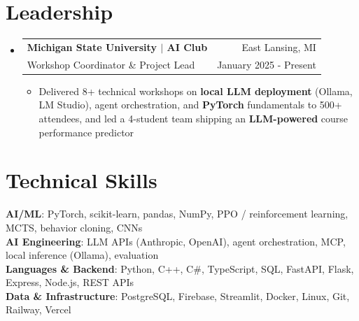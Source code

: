 \documentclass[letterpaper,11pt]{article}
\makeatletter
\newcommand{\resumeItem}[1]{
  \item\small{
    {#1 \vspace{-2pt}}
  }
}
\newcommand{\resumeSubheading}[4]{
  \vspace{-2pt}\item
    \begin{tabular*}{0.97\textwidth}[t]{l@{\extracolsep{\fill}}r}
      \textbf{#1} & \small #2 \\
      \small#3 & \small #4 \\
    \end{tabular*}\vspace{-7pt}
}
\newcommand{\resumeSubHeadingListStart}{\begin{itemize}[leftmargin=0.15in, label={}]}
\newcommand{\resumeSubHeadingListEnd}{\end{itemize}}
\newcommand{\resumeItemListStart}{\begin{itemize}}
\newcommand{\resumeItemListEnd}{\end{itemize}\vspace{-5pt}}
\makeatother
\begin{document}
\section{Leadership}
  \resumeSubHeadingListStart
    \resumeSubheading
      {Michigan State University $|$ AI Club}{East Lansing, MI}
      {Workshop Coordinator \& Project Lead}{January 2025 - Present}
      \resumeItemListStart
        \resumeItem{Delivered 8+ technical workshops on \textbf{local LLM deployment} (Ollama, LM Studio), agent orchestration, and \textbf{PyTorch} fundamentals to 500+ attendees, and led a 4-student team shipping an \textbf{LLM-powered} course performance predictor}
      \resumeItemListEnd
  \resumeSubHeadingListEnd

\section{Technical Skills}
 \begin{itemize}[leftmargin=0.15in, label={}]
    \small{\item{
     \textbf{AI/ML}{: PyTorch, scikit-learn, pandas, NumPy, PPO / reinforcement learning, MCTS, behavior cloning, CNNs} \\
     \textbf{AI Engineering}{: LLM APIs (Anthropic, OpenAI), agent orchestration, MCP, local inference (Ollama), evaluation} \\
     \textbf{Languages \& Backend}{: Python, C++, C\#, TypeScript, SQL, FastAPI, Flask, Express, Node.js, REST APIs} \\
     \textbf{Data \& Infrastructure}{: PostgreSQL, Firebase, Streamlit, Docker, Linux, Git, Railway, Vercel}
    }}
 \end{itemize}
\end{document}
